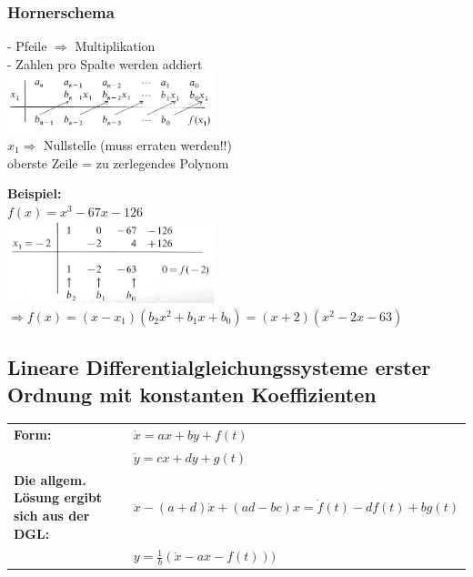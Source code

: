 \subsubsection{Hornerschema}
\begin{minipage}[t]{9cm}
- Pfeile $\Rightarrow$ Multiplikation\\
- Zahlen pro Spalte werden addiert\\
\includegraphics[width=6cm]{./bilder/Hornerschema_1.png}\\
$x_1 \Rightarrow$ Nullstelle (muss erraten werden!!)\\
oberste Zeile = zu zerlegendes Polynom
\end{minipage}
\begin{minipage}[t]{9cm}
\textbf{Beispiel:}\\
$f(x) = x^3-67x-126$\\
\includegraphics[width=6cm]{./bilder/Hornerschema_2.png}\\
$\Rightarrow f(x) = (x-x_1)(b_2x^2 + b_1x + b_0) = (x+2)(x^2-2x-63)$  
\end{minipage}

\subsection{Lineare Differentialgleichungssysteme erster Ordnung mit konstanten
Koeffizienten}
\begin{tabular}{p{8cm}p{8cm}}
\textbf{Form:}&
$\dot{x}=ax+by+f(t)$\\
&
$\dot{y}=cx+dy+g(t)$\\
\textbf{Die allgem. Lösung ergibt sich aus der DGL:}&
$\ddot{x}-(a+d)\dot{x}+(ad-bc)x=\dot{f}(t)-df(t)+bg(t)$\\
&
$y=\frac{1}{b}(\dot{x}-ax-f(t)))$\\
\end{tabular}

